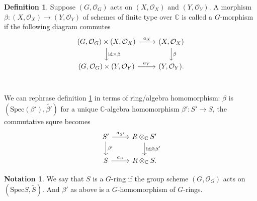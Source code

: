 \documentclass{article}
\theoremstyle{definition}
\newtheorem{definition}{Definition}
\newtheorem*{notation}{Notation}
\newcommand{\Spec}{\mathrm{Spec}}
\newcommand{\ssheaf}[1]{\widetilde{#1}}
\newcommand{\tensorC}[2]{#1\otimes_\mathbb C #2}
\newcommand{\tensor}[2]{#1\otimes#2}
\newcommand{\so}[1]{(#1, \mathcal O_{#1})}
\newcommand{\id}{\mathrm{id}}
\newcommand{\sr}[1]{(\Spec{#1},\ssheaf{#1})}
\newcommand{\srb}[1]{(\Spec{(#1)},\ssheaf{#1})}
\begin{document}
\begin{definition}\label{def:G-morphism}
  Suppose $\so G$ acts on $\so X$ and $\so Y$. A morphism $\beta : \so X \to \so Y$ of schemes of finite type over $\mathbb C$ is called a $G$-morphism if the following diagram commutes
  \begin{equation*}
    \begin{tikzcd}
      \so G\times \so X \arrow[r, "a_X"] \arrow[d, "{\id\times\beta}"]& \so X \arrow[d, "\beta"]\\
      \so G\times \so Y \arrow[r, "a_Y"]& \so Y. \\
    \end{tikzcd}
  \end{equation*}
\end{definition}

We can rephrase definition \ref{def:G-morphism} in terms of ring/algebra homomorphism:
$\beta$ is $\srb{\beta'}$ for a unique $\mathbb C$-algebra homomorphism $\beta':S'\to S$, %
the commutative squre becomes
\begin{equation*}
\begin{tikzcd}
  S' \arrow[r, "{a_{S'}}"]\arrow[d, "\beta'"]& \tensorC{R}{S'} \arrow[d, "{\tensor{\id}{\beta'}}"]\\
  S \arrow[r, "{a_S}"]& \tensorC{R}{S}.
\end{tikzcd}
\end{equation*}

\begin{notation}
We say that $S$ is a $G$-ring if the group scheme $\so G$ acts on $\sr S$. And $\beta'$ as above is a $G$-homomorphism of $G$-rings.
\end{notation}
\end{document}
